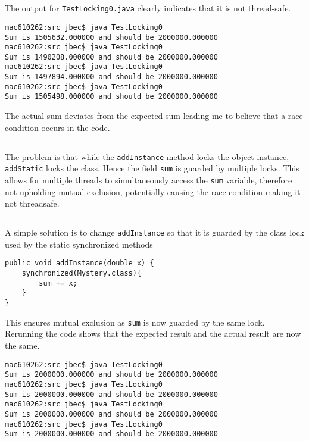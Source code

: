 \documentclass{ituhandin}
\begin{document}
\maketitlepage
\signpage

\chapter{} %

\section{}
The output for \texttt{TestLocking0.java} clearly indicates that it is not thread-safe.
\begin{lstlisting}[language={}, frame={}]
mac610262:src jbec$ java TestLocking0
Sum is 1505632.000000 and should be 2000000.000000
mac610262:src jbec$ java TestLocking0
Sum is 1490208.000000 and should be 2000000.000000
mac610262:src jbec$ java TestLocking0
Sum is 1497894.000000 and should be 2000000.000000
mac610262:src jbec$ java TestLocking0
Sum is 1505498.000000 and should be 2000000.000000
\end{lstlisting}

The actual sum deviates from the expected sum leading me to believe that a race condition occurs in the code.

\section{}
The problem is that while the \texttt{addInstance} method locks the object instance, \texttt{addStatic} locks the class. Hence the field \texttt{sum} is guarded by multiple locks. This allows for multiple threads to simultaneously access the \texttt{sum} variable, therefore not upholding mutual exclusion, potentially causing the race condition making it not threadsafe.

\section{}
A simple solution is to change \texttt{addInstance} so that it is guarded by the class lock used by the static synchronized methods
\begin{lstlisting}[frame={}]
public void addInstance(double x) {
    synchronized(Mystery.class){
        sum += x;
    }
}
\end{lstlisting}
This ensures mutual exclusion as \texttt{sum} is now guarded by the same lock. Rerunning the code shows that the expected result and the actual result are now the same.

\begin{lstlisting}[language={}, frame={}]
mac610262:src jbec$ java TestLocking0
Sum is 2000000.000000 and should be 2000000.000000
mac610262:src jbec$ java TestLocking0
Sum is 2000000.000000 and should be 2000000.000000
mac610262:src jbec$ java TestLocking0
Sum is 2000000.000000 and should be 2000000.000000
mac610262:src jbec$ java TestLocking0
Sum is 2000000.000000 and should be 2000000.000000
\end{lstlisting}
\end{document}
